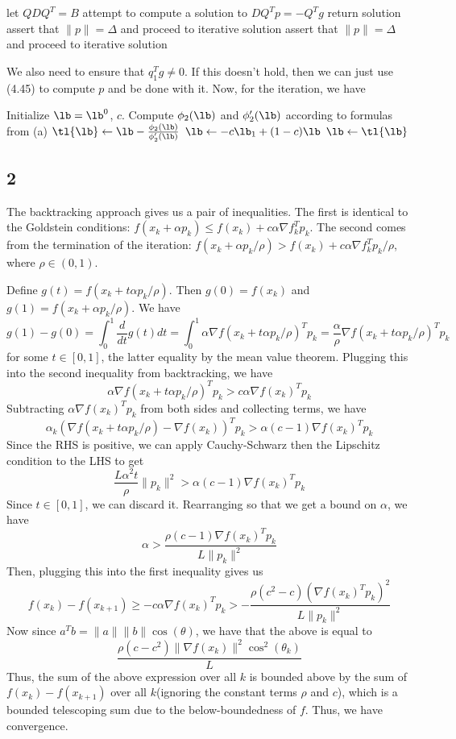 \documentclass{article}
\newcommand{\ep}{\epsilon}
\begin{document}
\begin{algorithmic}
    \State let $QDQ^T=B$
        \State attempt to compute a solution to $DQ^Tp=-Q^Tg$
            \State return solution
        \Else
            \State assert that $\|p\|=\Delta$ and proceed to iterative solution
        \EndIf
    \Else
        \State assert that $\|p\|=\Delta$ and proceed to iterative solution
    \EndIf
\end{algorithmic}

We also need to ensure that $q_1^Tg\neq0$. If this doesn't hold, then we can just use (4.45) to compute $p$ and be done with it. Now, for the iteration, we have

\begin{algorithmic}
    \State Initialize $\lb=\lb^0$, $c$.
    \While{$|\phi_2(\lb)|>\ep$}
        \State Compute $\phi_2(\lb)$ and $\phi_2'(\lb)$ according to formulas from (a)
        \State $\tl{\lb}\gets\lb-\frac{\phi_2(\lb)}{\phi_2'(\lb)}$
            \State $\lb\gets-c\lb_1+(1-c)\lb$
        \Else
            \State $\lb\gets\tl{\lb}$
        \EndIf
    \EndWhile
\end{algorithmic}
\subsection*{2}
The backtracking approach gives us a pair of inequalities. The first is identical to the Goldstein conditions:  $f(x_k+\alpha p_k)\leq f(x_k)+c\alpha\nabla f_k^Tp_k$. The second comes from the termination of the iteration: $f(x_k+\alpha p_k/\rho)>f(x_k)+c\alpha\nabla f_k^Tp_k/\rho$, where $\rho\in(0,1)$. 

Define $g(t)=f(x_k+t\alpha p_k/\rho)$. Then $g(0)=f(x_k)$ and $g(1)=f(x_k+\alpha p_k/\rho)$. We have 
\[g(1)-g(0)=\int_0^1\frac{d}{dt}g(t)dt=\int_0^1\alpha\nabla f(x_k+t\alpha p_k/\rho)^Tp_k=\frac{\alpha}{\rho}\nabla f(x_k+t\alpha p_k/\rho)^Tp_k\]
for some $t\in[0,1]$, the latter equality by the mean value theorem. Plugging this into the second inequality from backtracking, we have
\[\alpha\nabla f(x_k+t\alpha p_k/\rho)^Tp_k>c\alpha\nabla f(x_k)^Tp_k\]
Subtracting $\alpha\nabla f(x_k)^Tp_k$ from both sides and collecting terms, we have
\[\alpha_k\left(\nabla f(x_k+t\alpha p_k/\rho)-\nabla f(x_k)\right)^Tp_k>\alpha(c-1)\nabla f(x_k)^Tp_k\]
Since the RHS is positive, we can apply Cauchy-Schwarz then the Lipschitz condition to the LHS to get
\[\frac{L\alpha^2t}{\rho}\|p_k\|^2>\alpha(c-1)\nabla f(x_k)^Tp_k\]
Since $t\in[0,1]$, we can discard it. Rearranging so that we get a bound on $\alpha$, we have 
\[\alpha>\frac{\rho(c-1)\nabla f(x_k)^Tp_k}{L\|p_k\|^2}\]
Then, plugging this into the first inequality gives us
\[f(x_k)-f(x_{k+1})\geq-c\alpha\nabla f(x_k)^Tp_k>-\frac{\rho(c^2-c)\left(\nabla f(x_k)^Tp_k\right)^2}{L\|p_k\|^2}\]
Now since $a^Tb=\|a\|\|b\|\cos(\theta)$, we have that the above is equal to 
\[\frac{\rho(c-c^2)\|\nabla f(x_k)\|^2\cos^2(\theta_k)}{L}\]
Thus, the sum of the above expression over all $k$ is bounded above by the sum of $f(x_k)-f(x_{k+1})$ over all $k$(ignoring the constant terms $\rho$ and $c$), which is a bounded telescoping sum due to the below-boundedness of $f$. Thus, we have convergence.
\end{document}
